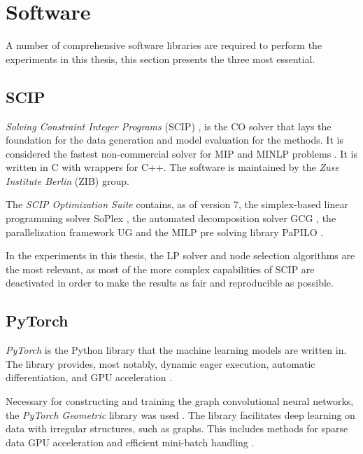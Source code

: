 \section{Software}

A number of comprehensive software libraries are required to perform the experiments in this thesis, this section presents the three most essential.  


\subsection{SCIP}

\textit{Solving Constraint Integer Programs }(\gls{SCIP})
\cite{achterberg2009scip}, is the \gls{CO} solver that lays the foundation for the data generation and model evaluation for the methods. It is considered the fastest non-commercial solver for \gls{MIP} and \gls{MINLP} problems \cite{gamrath2020scip}. It is written in C with wrappers for C++. The software is maintained by the\textit{ Zuse Institute Berlin} (ZIB) group. 

The \textit{SCIP Optimization Suite} contains, as of version 7, the simplex-based linear programming solver SoPlex \cite{wunderling1996soplex}, the automated decomposition solver GCG \cite{gamrath2010gcg}, the parallelization framework UG \cite{shinano2018ug} and the \gls{MILP} pre solving library PaPILO \cite{gamrath2020scip}.

In the experiments in this thesis, the \gls{LP} solver and node selection algorithms are the most relevant, as most of the more complex capabilities of \gls{SCIP} are deactivated in order to make the results as fair and reproducible as possible. 





\subsection{PyTorch}

\textit{PyTorch} is the Python library that the machine learning models are written in. The library provides, most notably, dynamic eager execution, automatic differentiation, and \gls{GPU} acceleration \cite{paszke2019pytorch}. 

Necessary for constructing and training the graph convolutional neural networks, the \textit{PyTorch Geometric} library was used \cite{fey2019pytorchgeometric}. The library facilitates deep learning on data with irregular structures, such as graphs. This includes methods for sparse data GPU acceleration and efficient mini-batch handling \cite{fey2019pytorchgeometric}. 




